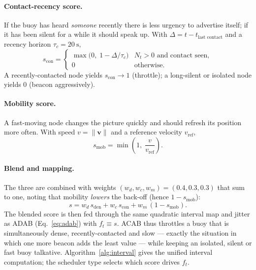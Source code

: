\documentclass[12pt,a4paper,oneside]{report}
\begin{document}
\paragraph{Contact-recency score.} If the buoy has heard \emph{someone} recently
there is less urgency to advertise itself; if it has been silent for a while it
should speak up. With $\Delta = t - t_{\text{last contact}}$ and a recency
horizon $\tau_c = \SI{20}{\second}$,
\begin{equation}
  s_{\mathrm{con}} =
  \begin{cases}
    \max\!\big(0,\; 1 - \Delta/\tau_c\big) & N_t>0 \text{ and contact seen},\\
    0 & \text{otherwise.}
  \end{cases}
\end{equation}
A recently-contacted node yields $s_{\mathrm{con}}\to 1$ (throttle); a long-silent
or isolated node yields $0$ (beacon aggressively).

\paragraph{Mobility score.} A fast-moving node changes the picture quickly and
should refresh its position more often. With speed $v=\lVert\mathbf{v}\rVert$ and
a reference velocity $v_{\text{ref}}$,
\begin{equation}
  s_{\mathrm{mob}} = \min\!\left(1,\;\frac{v}{v_{\text{ref}}}\right).
\end{equation}

\paragraph{Blend and mapping.} The three are combined with weights
$(w_d,w_c,w_m)=(0.4,0.3,0.3)$ that sum to one, noting that mobility \emph{lowers}
the back-off (hence $1-s_{\mathrm{mob}}$):
\begin{equation}
  s = w_d\,s_{\mathrm{den}} + w_c\,s_{\mathrm{con}} + w_m\,(1 - s_{\mathrm{mob}}).
  \label{eq:acab-blend}
\end{equation}
The blended score is then fed through the same quadratic interval map and jitter
as ADAB (Eq.~\ref{eq:adab}) with $f_t\equiv s$. ACAB thus throttles a buoy that
is simultaneously dense, recently-contacted and slow --- exactly the situation in
which one more beacon adds the least value --- while keeping an isolated,
silent or fast buoy talkative. Algorithm~\ref{alg:interval} gives the unified
interval computation; the scheduler type selects which score drives $f_t$.
\end{document}
